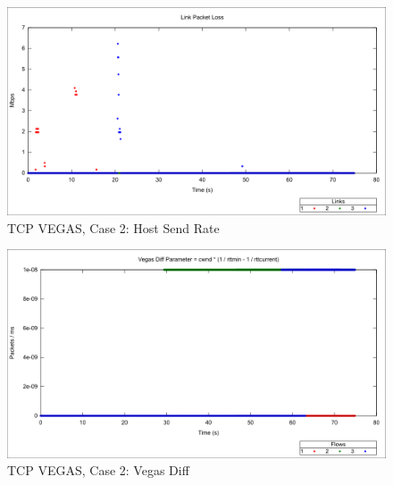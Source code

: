 \begin{figure}[htbp]
    \centering
    \includegraphics[width=\textwidth]{vegas2/Link_Packet_Loss.png}
    \caption{TCP VEGAS, Case 2: Host Send Rate}
\end{figure}

\begin{figure}[htbp]
    \centering
    \includegraphics[width=\textwidth]{vegas2/Vegas_Diff.png}
    \caption{TCP VEGAS, Case 2: Vegas Diff}
\end{figure}


